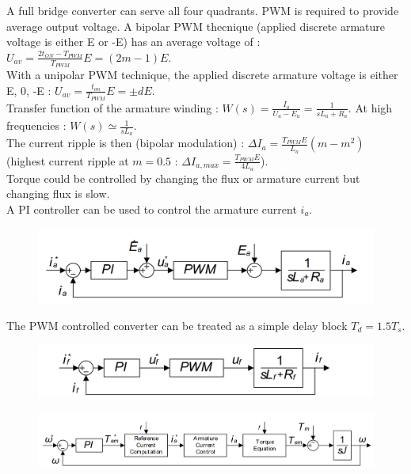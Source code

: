 \documentclass[../main.tex]{subfiles}
\begin{document}
A full bridge converter can serve all four quadrants. PWM is required to provide average output voltage. A bipolar PWM thecnique (applied discrete armature voltage is either E or -E) has an average voltage of : $U_{av} = \frac{2t_{ON}-T_{PWM}}{T_{PWM}} E = (2m-1) E$.\\
With a unipolar PWM technique, the applied discrete armature voltage is either E, 0, -E : $U_{av} = \frac{t_{on}}{T_{PWM}} E = \pm dE$.\\
Transfer function of the armature winding : $W(s) = \frac{I_a}{U_a-E_a} = \frac{1}{sL_a+R_a}$. At high frequencies : $W(s) \simeq \frac{1}{sL_a}$.\\
The current ripple is then (bipolar modulation) : $\Delta I_a = \frac{T_{PWM}E}{L_a} (m-m^2)$ (highest current ripple at $m=0.5$ : $\Delta I_{a,max} = \frac{T_{PWM} E}{4L_a}$).\\

Torque could be controlled by changing the flux or armature current but changing flux is slow.\\
A PI controller can be used to control the armature current $i_a$. \\
\begin{figure}[hbt!]
    \centering
    \includegraphics[width=0.5\linewidth]{IMAGES/Indus_el/Screenshot from 2025-03-03 17-12-49.png}
\end{figure}

\warning The PWM controlled converter can be treated as a simple delay block $T_d = 1.5T_s$.\\

\begin{figure}[hbt!]
    \centering
    \includegraphics[width=0.5\linewidth]{IMAGES/Indus_el/Screenshot from 2025-03-03 17-14-14.png}
\end{figure}

\begin{figure}[hbt!]
    \centering
    \includegraphics[width=0.5\linewidth]{IMAGES/Indus_el/Screenshot from 2025-03-03 17-15-19.png}
\end{figure}
\end{document}
